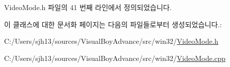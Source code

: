 Video\+Mode.\+h 파일의 41 번째 라인에서 정의되었습니다.



이 클래스에 대한 문서화 페이지는 다음의 파일들로부터 생성되었습니다.\+:\begin{DoxyCompactItemize}
\item 
C\+:/\+Users/sjh13/sources/\+Visual\+Boy\+Advance/src/win32/\mbox{\hyperlink{_video_mode_8h}{Video\+Mode.\+h}}\item 
C\+:/\+Users/sjh13/sources/\+Visual\+Boy\+Advance/src/win32/\mbox{\hyperlink{_video_mode_8cpp}{Video\+Mode.\+cpp}}\end{DoxyCompactItemize}
